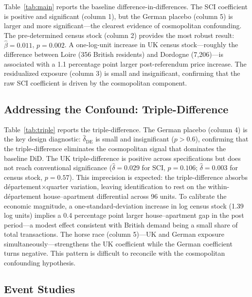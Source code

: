 \documentclass[12pt]{article}
\begin{document}
Table~\ref{tab:main} reports the baseline difference-in-differences. The SCI coefficient is positive and significant (column 1), but the German placebo (column 5) is larger and more significant---the clearest evidence of cosmopolitan confounding. The pre-determined census stock (column 2) provides the most robust result: $\hat{\beta} = 0.011$, $p = 0.002$. A one-log-unit increase in UK census stock---roughly the difference between Loire (356 British residents) and Dordogne (7,206)---is associated with a 1.1 percentage point larger post-referendum price increase. The residualized exposure (column 3) is small and insignificant, confirming that the raw SCI coefficient is driven by the cosmopolitan component.

{\footnotesize}

\subsection{Addressing the Confound: Triple-Difference}

Table~\ref{tab:triple} reports the triple-difference. The German placebo (column 4) is the key design diagnostic: $\hat{\delta}_{\text{DE}}$ is small and insignificant ($p > 0.6$), confirming that the triple-difference eliminates the cosmopolitan signal that dominates the baseline DiD. The UK triple-difference is positive across specifications but does not reach conventional significance ($\hat{\delta} = 0.029$ for SCI, $p = 0.106$; $\hat{\delta} = 0.003$ for census stock, $p = 0.57$). This imprecision is expected: the triple-difference absorbs d\'epartement$\times$quarter variation, leaving identification to rest on the within-d\'epartement house--apartment differential across 96 units. To calibrate the economic magnitude, a one-standard-deviation increase in log census stock (1.39 log units) implies a 0.4 percentage point larger house--apartment gap in the post period---a modest effect consistent with British demand being a small share of total transactions. The horse race (column 5)---UK and German exposure simultaneously---strengthens the UK coefficient while the German coefficient turns negative. This pattern is difficult to reconcile with the cosmopolitan confounding hypothesis.

{\footnotesize}

\subsection{Event Studies}
\end{document}
